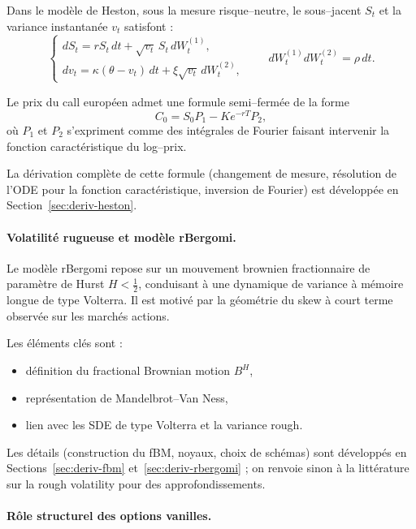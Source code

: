 \documentclass[11pt,a4paper]{article}
\newcommand{\1}{\mathbf{1}}
\begin{document}
Dans le modèle de Heston, sous la mesure risque--neutre, le sous--jacent $S_t$ et la variance
instantanée $v_t$ satisfont :
\[
\begin{cases}
dS_t = r S_t \, dt + \sqrt{v_t}\, S_t\, dW_t^{(1)}, \\[3pt]
dv_t = \kappa(\theta - v_t)\, dt + \xi \sqrt{v_t}\, dW_t^{(2)},
\end{cases}
\qquad
dW_t^{(1)} dW_t^{(2)} = \rho\, dt.
\]

Le prix du call européen admet une formule semi--fermée de la forme
\[
C_0 = S_0 P_1 - K e^{-rT} P_2,
\]
où $P_1$ et $P_2$ s'expriment comme des intégrales de Fourier faisant intervenir
la fonction caractéristique du log--prix.

La dérivation complète de cette formule (changement de mesure, résolution de l'ODE
pour la fonction caractéristique, inversion de Fourier) est développée en
Section~\ref{sec:deriv-heston}.

\paragraph{Volatilité rugueuse et modèle rBergomi.}

Le modèle rBergomi repose sur un mouvement brownien fractionnaire de paramètre de Hurst
$H < \tfrac{1}{2}$, conduisant à une dynamique de variance à mémoire longue de type Volterra.
Il est motivé par la g\'eom\'etrie du skew \`a court terme observ\'ee sur les march\'es actions.

Les éléments clés sont :
\begin{itemize}
  \item définition du fractional Brownian motion $B^H$,
  \item représentation de Mandelbrot--Van Ness,
  \item lien avec les SDE de type Volterra et la variance rough.
\end{itemize}

Les d\'etails (construction du fBM, noyaux, choix de sch\'emas) sont d\'evelopp\'es en
Sections~\ref{sec:deriv-fbm} et~\ref{sec:deriv-rbergomi} ; on renvoie sinon \`a la litt\'erature
sur la rough volatility pour des approfondissements.

\paragraph{Rôle structurel des options vanilles.}
\end{document}
